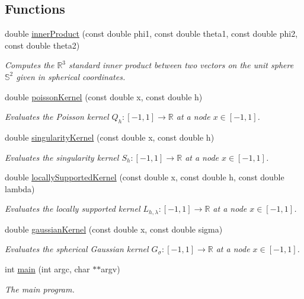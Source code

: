 \subsection*{Functions}
\begin{CompactItemize}
\item 
double \hyperlink{group__applications__fastsumS2__test_ga0}{inner\-Product} (const double phi1, const double theta1, const double phi2, const double theta2)
\begin{CompactList}\small\item\em Computes the $\mathbb{R}^3$ standard inner product between two vectors on the unit sphere $\mathbb{S}^2$ given in spherical coordinates. \item\end{CompactList}\item 
double \hyperlink{group__applications__fastsumS2__test_ga1}{poisson\-Kernel} (const double x, const double h)
\begin{CompactList}\small\item\em Evaluates the Poisson kernel $Q_h: [-1,1] \rightarrow \mathbb{R}$ at a node $x \in [-1,1]$. \item\end{CompactList}\item 
double \hyperlink{group__applications__fastsumS2__test_ga2}{singularity\-Kernel} (const double x, const double h)
\begin{CompactList}\small\item\em Evaluates the singularity kernel $S_h: [-1,1] \rightarrow \mathbb{R}$ at a node $x \in [-1,1]$. \item\end{CompactList}\item 
double \hyperlink{group__applications__fastsumS2__test_ga3}{locally\-Supported\-Kernel} (const double x, const double h, const double lambda)
\begin{CompactList}\small\item\em Evaluates the locally supported kernel $L_{h,\lambda}: [-1,1] \rightarrow \mathbb{R}$ at a node $x \in [-1,1]$. \item\end{CompactList}\item 
double \hyperlink{group__applications__fastsumS2__test_ga4}{gaussian\-Kernel} (const double x, const double sigma)
\begin{CompactList}\small\item\em Evaluates the spherical Gaussian kernel $G_\sigma: [-1,1] \rightarrow \mathbb{R}$ at a node $x \in [-1,1]$. \item\end{CompactList}\item 
int \hyperlink{group__applications__fastsumS2__test_ga5}{main} (int argc, char $\ast$$\ast$argv)
\begin{CompactList}\small\item\em The main program. \item\end{CompactList}\end{CompactItemize}


